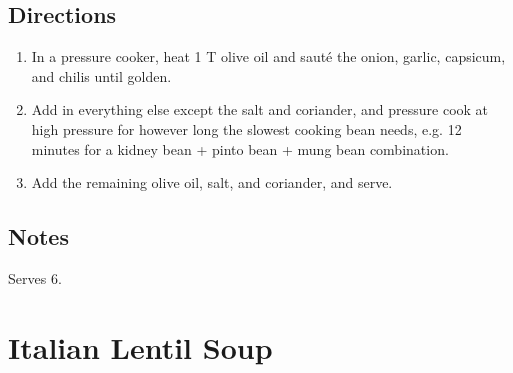 \documentclass[letterpaper,10pt,english]{sphinxmanual}
\begin{document}
\section{Directions}
\label{chili:directions}\begin{enumerate}
\item {} 
In a pressure cooker, heat 1 T olive oil and sauté the onion, garlic, capsicum, and chilis until golden.

\item {} 
Add in everything else except the salt and coriander, and pressure cook at high pressure for however long the slowest cooking bean needs, e.g. 12 minutes for a kidney bean + pinto bean + mung bean combination.

\item {} 
Add the remaining olive oil, salt, and coriander, and serve.

\end{enumerate}


\section{Notes}
\label{chili:notes}
Serves 6.


\chapter{Italian Lentil Soup}
\label{italian_lentil_soup:italian-lentil-soup}\label{italian_lentil_soup::doc}
\end{document}
